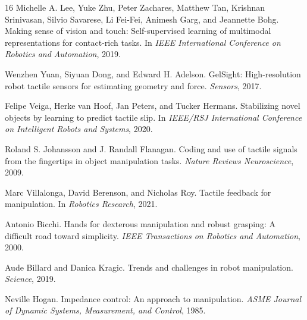 \documentclass{article}
\begin{document}
\begin{thebibliography}{16}
Michelle A. Lee, Yuke Zhu, Peter Zachares, Matthew Tan, Krishnan Srinivasan, Silvio Savarese, Li Fei-Fei, Animesh Garg, and Jeannette Bohg.
\newblock Making sense of vision and touch: Self-supervised learning of multimodal representations for contact-rich tasks.
\newblock In \emph{IEEE International Conference on Robotics and Automation}, 2019.

Wenzhen Yuan, Siyuan Dong, and Edward H. Adelson.
\newblock GelSight: High-resolution robot tactile sensors for estimating geometry and force.
\newblock \emph{Sensors}, 2017.

Felipe Veiga, Herke van Hoof, Jan Peters, and Tucker Hermans.
\newblock Stabilizing novel objects by learning to predict tactile slip.
\newblock In \emph{IEEE/RSJ International Conference on Intelligent Robots and Systems}, 2020.

Roland S. Johansson and J. Randall Flanagan.
\newblock Coding and use of tactile signals from the fingertips in object manipulation tasks.
\newblock \emph{Nature Reviews Neuroscience}, 2009.

Marc Villalonga, David Berenson, and Nicholas Roy.
\newblock Tactile feedback for manipulation.
\newblock In \emph{Robotics Research}, 2021.

Antonio Bicchi.
\newblock Hands for dexterous manipulation and robust grasping: A difficult road toward simplicity.
\newblock \emph{IEEE Transactions on Robotics and Automation}, 2000.

Aude Billard and Danica Kragic.
\newblock Trends and challenges in robot manipulation.
\newblock \emph{Science}, 2019.

Neville Hogan.
\newblock Impedance control: An approach to manipulation.
\newblock \emph{ASME Journal of Dynamic Systems, Measurement, and Control}, 1985.
\end{thebibliography}
\end{document}
